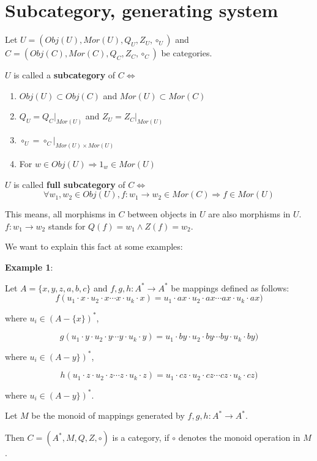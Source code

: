 \section{Subcategory, generating system}

\begin{definition}
Let $U = (Obj(U), Mor(U), Q_U, Z_U, \circ_U)$ and $C = (Obj(C), Mor(C), Q_C,
Z_C, \circ_C)$ be categories.

$U$ is called a {\bf subcategory} of $C \Leftrightarrow$
\begin{enumerate}
  \item $Obj(U) \subset Obj(C)$ and $Mor(U) \subset Mor(C)$
  \item $Q_U = Q_C|_{Mor(U)}$ and $Z_U = Z_C|_{Mor(U)}$
  \item $\circ_U = \circ_C|_{Mor(U) \times Mor(U)}$
  \item For $w \in Obj(U) \Rightarrow 1_w \in Mor(U)$
\end{enumerate}
\end{definition}

$U$ is called {\bf full subcategory} of $C \Leftrightarrow$
\[ \forall w_1, w_2 \in Obj(U), f: w_1 \to w_2 \in Mor(C) \Rightarrow f \in
Mor(U) \]

This means, all morphisms in $C$ between objects in $U$ are also morphisms in
$U$. $f: w_1 \to w_2$ stands for $Q(f) = w_1 \wedge Z(f) = w_2$.

We want to explain this fact at some examples:

{\bf Example 1}:

Let $A = \{ x,y,z,a,b,c \}$ and $f, g, h: A^* \to A^*$ be mappings defined as
follows:
\[ f(u_1 \cdot x \cdot u_2 \cdot x \cdots x \cdot u_k \cdot x) = 
u_1 \cdot ax \cdot u_2 \cdot ax \cdots ax \cdot u_k \cdot ax) \]

where $u_i \in (A - \{x\})^*$,

\[ g(u_1 \cdot y \cdot u_2 \cdot y \cdots y \cdot u_k \cdot y) = 
u_1 \cdot by \cdot u_2 \cdot by \cdots by \cdot u_k \cdot by) \]

where $u_i \in (A - y\})^*$,

\[ h(u_1 \cdot z \cdot u_2 \cdot z \cdots z \cdot u_k \cdot z) = 
u_1 \cdot cz \cdot u_2 \cdot cz \cdots cz \cdot u_k \cdot cz) \]

where $u_i \in (A - y\})^*$.

Let $M$ be the monoid of mappings generated by $f, g, h : A^* \to A^*$.

Then $C = ({A^*}, M, Q, Z, \circ)$ is a category, if $\circ$ denotes the monoid
operation in $M$.

